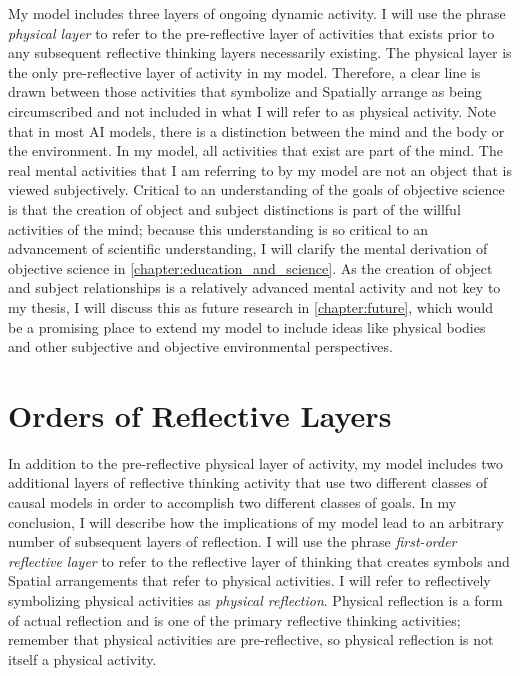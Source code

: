 My model includes three layers of ongoing dynamic activity.  I will
use the phrase \emph{physical layer} to refer to the pre-reflective
layer of activities that exists prior to any subsequent reflective
thinking layers necessarily existing.  The physical layer is the only
pre-reflective layer of activity in my model.  Therefore, a clear line
is drawn between those activities that symbolize and Spatially arrange
as being circumscribed and not included in what I will refer to as
physical activity.  Note that in most AI models, there is a
distinction between the mind and the body or the environment.  In my
model, all activities that exist are part of the mind.  The real
mental activities that I am referring to by my model are not an object
that is viewed subjectively.  Critical to an understanding of the
goals of objective science is that the creation of object and subject
distinctions is part of the willful activities of the mind; because
this understanding is so critical to an advancement of scientific
understanding, I will clarify the mental derivation of objective
science in \autoref{chapter:education_and_science}.  As the creation
of object and subject relationships is a relatively advanced mental
activity and not key to my thesis, I will discuss this as future
research in \autoref{chapter:future}, which would be a promising place
to extend my model to include ideas like physical bodies and other
subjective and objective environmental perspectives.

\section{Orders of Reflective Layers}

In addition to the pre-reflective physical layer of activity, my model
includes two additional layers of reflective thinking activity that
use two different classes of causal models in order to accomplish two
different classes of goals.  In my conclusion, I will describe how the
implications of my model lead to an arbitrary number of subsequent
layers of reflection.  I will use the phrase \emph{first-order
  reflective layer} to refer to the reflective layer of thinking that
creates symbols and Spatial arrangements that refer to physical
activities.  I will refer to reflectively symbolizing physical
activities as \emph{physical reflection}.  Physical reflection is a
form of actual reflection and is one of the primary reflective
thinking activities; remember that physical activities are
pre-reflective, so physical reflection is not itself a physical
activity.


